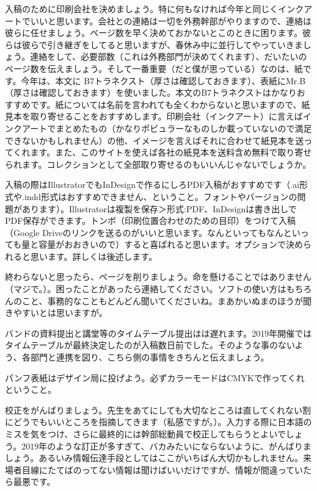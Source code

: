 \documentclass[dvipdfmx,jb5]{jreport}
\begin{document}
入稿のために印刷会社を決めましょう。特に何もなければ今年と同じくインクアートでいいと思います。会社との連絡は一切を外務幹部がやりますので、連絡は彼らに任せましょう。ページ数を早く決めておかないとこのときに困ります。彼らは彼らで引き継ぎをしてると思いますが、春休み中に並行してやっていきましょう。連絡をして、必要部数（これは外務部門が決めてくれます）、だいたいのページ数を伝えましょう。そして一番重要（だと僕が思っている）なのは、紙です。今年は、本文に B7トラネクスト（厚さは確認しておきます）、表紙にMr.B（厚さは確認しておきます）を使いました。本文のB7トラネクストはかなりおすすめです。紙については名前を言われても全くわからないと思いますので、紙見本を取り寄せることをおすすめします。印刷会社（インクアート）に言えばインクアートでまとめたもの（かなりポピュラーなものしか載っていないので満足できないかもしれません）の他、イメージを言えばそれに合わせて紙見本を送ってくれます。また、このサイトを使えば各社の紙見本を送料含め無料で取り寄せられます。コレクションとして全部取り寄せるのもいいんじゃないでしょうか。

入稿の際はIllustratorでもInDesignで作るにしろPDF入稿がおすすめです（.ai形式や.indd形式はおすすめできません、ということ。フォントやバージョンの問題があります）。Illustratorは複製を保存＞形式:PDF、InDesignは書き出しでPDF保存ができます。トンボ（印刷位置合わせのための目印）をつけて入稿（Google Driveのリンクを送るのがいいと思います。なんといってもなんといっても量と容量がおおきいので）すると喜ばれると思います。オプションで決められると思います。詳しくは後述します。

終わらないと思ったら、ページを削りましょう。命を懸けることではありません（マジで。）。困ったことがあったら連絡してください。ソフトの使い方はもちろんのこと、事務的なこともどんどん聞いてくださいね。まあかいぬまのほうが聞きやすいとは思いますが。

バンドの資料提出と講堂等のタイムテーブル提出はは遅れます。2019年開催ではタイムテーブルが最終決定したのが入稿数日前でした。そのような事のないよう、各部門と連携を図り、こちら側の事情をきちんと伝えましょう。

パンフ表紙はデザイン局に投げよう。必ずカラーモードはCMYKで作ってくれということ。

校正をがんばりましょう。先生をあてにしても大切なところは直してくれない割にどうでもいいところを指摘してきます（私感ですが。）。入力する際に日本語のミスを気をつけ、さらに最終的には幹部総動員で校正してもらうとよいでしょう。2019年のような訂正が多すぎて、バカみたいにならないように、がんばりましょう。あるいみ情報伝達手段としてはここがいちばん大切かもしれません。来場者目線にたてばのってない情報は聞けばいいだけですが、情報が間違っていたら最悪です。
\end{document}
